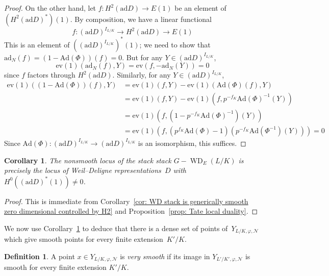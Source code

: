 \documentclass{amsart}
\def\Ad{\mathrm{Ad}}
\def\ad{\mathrm{ad}}
\newtheorem{cor}[subsubsection]{Corollary}
\theoremstyle{definition}
\newtheorem{defn}[subsubsection]{Definition}
\theoremstyle{remark}
\newcommand{\mar}[1]{}
\newcommand{\mar}[1]{\marginpar{\raggedright\tiny squirrel #1}}
\DeclareMathOperator{\WD}{WD}
\begin{document}
\begin{proof}
On the other hand, let $f:H^2(\ad D)\rightarrow E(1)$ be an element of $(H^2(\ad D)^\ast)(1)$.  By composition, we have a linear functional
\[	f:(\ad D)^{I_{L/K}}\rightarrow H^2(\ad D)\rightarrow E(1)	\]
This is an element of $\left((\ad D)^{I_{L/K}}\right)^\ast(1)$; we need to show that $\ad_N(f)=(1-\Ad(\Phi))(f)=0$.  But for any $Y\in(\ad D)^{I_{L/K}}$,
\[	\mathrm{ev}(1)(\ad_N(f),Y)=\mathrm{ev}(f,-\ad_N(Y))=0	\]
since $f$ factors through $H^2(\ad D)$.  Similarly, for any $Y\in (\ad D)^{I_{L/K}}$,
\begin{align*}
\mathrm{ev}(1)((1-\Ad(\Phi))(f),Y)&=\mathrm{ev}(1)(f,Y)-\mathrm{ev}(1)(\Ad(\Phi)(f),Y)	\\
&=\mathrm{ev}(1)(f,Y)-\mathrm{ev}(1)(f,p^{-f_K}\Ad(\Phi)^{-1}(Y))	\\
&=\mathrm{ev}(1)(f,(1-p^{-f_K}\Ad(\Phi)^{-1})(Y))	\\
&=\mathrm{ev}(1)(f,(p^{f_K}\Ad(\Phi)-1)(p^{-f_K}\Ad(\Phi^{-1})(Y)))=0
\end{align*}
Since $\Ad(\Phi):(\ad D)^{I_{L/K}}\rightarrow (\ad D)^{I_{L/K}}$ is an isomorphism, this suffices.
\end{proof}%
\begin{cor}\label{cor: WD stack is generically smooth zero dimensional
  controlled by H0}
   The nonsmooth locus of the stack stack $G-\WD_E(L/K)$ is precisely the locus of Weil--Deligne
  representations~$D$ with $H^0((\ad D)^*(1))\ne 0$.
\end{cor}
\begin{proof}This is immediate from Corollary~\ref{cor: WD stack is generically smooth zero dimensional
  controlled by H2} and Proposition~\ref{prop: Tate local duality}.  
\end{proof}
We now use Corollary~\ref{cor: WD stack is generically smooth zero dimensional
  controlled by H0} to deduce that there is a dense set of points
of~$ Y_{L/K,\varphi,\mathcal N}$ which give smooth points for every finite
extension~$K'/K$.
\begin{defn}%
A point $x\in Y_{L/K,\varphi,\mathcal N}$ is \emph{very smooth} if its image in $Y_{L'/K',\varphi,\mathcal N}$ is smooth for every finite extension $K'/K$.
\end{defn}
\end{document}
